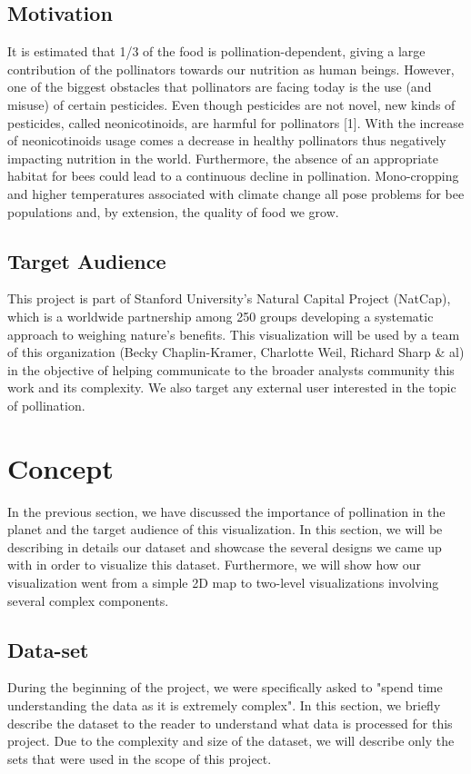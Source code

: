 \documentclass[12pt]{article}
\begin{document}
\subsection{Motivation}
It is estimated that 1/3 of the food is pollination-dependent, giving a large contribution of the pollinators towards our nutrition as human beings. However, one of the biggest obstacles that pollinators are facing today is the use (and misuse) of certain pesticides. Even though pesticides are not novel, new kinds of pesticides, called neonicotinoids, are harmful for pollinators [1]. With the increase of neonicotinoids usage comes a decrease in healthy pollinators thus negatively impacting nutrition in the world. Furthermore, the absence of an appropriate habitat for bees could lead to a continuous decline in pollination. Mono-cropping and higher temperatures associated with climate change all pose problems for bee populations and, by extension, the quality of food we grow. 
\subsection{Target Audience}
This project is part of Stanford University's Natural Capital Project (NatCap), which is a worldwide partnership among 250 groups developing a systematic approach to weighing nature’s benefits. This visualization will be used by a team of this organization (Becky Chaplin-Kramer, Charlotte Weil, Richard Sharp \& al) in the objective of helping communicate to the broader analysts community this work and its complexity. We also target any external user interested in the topic of pollination.
\section{Concept}
In the previous section, we have discussed the importance of pollination in the planet and the target audience of this visualization. In this section, we will be describing in details our dataset and showcase the several designs we came up with in order to visualize this dataset. Furthermore, we will show how our visualization went from a simple 2D map to two-level visualizations involving several complex components.
\subsection{Data-set}
During the beginning of the project, we were specifically asked to "spend time understanding the data as it is extremely complex". In this section, we briefly describe the dataset to the reader to understand what data is processed for this project. Due to the complexity and size of the dataset, we will describe only the sets that were used in the scope of this project.
\end{document}
